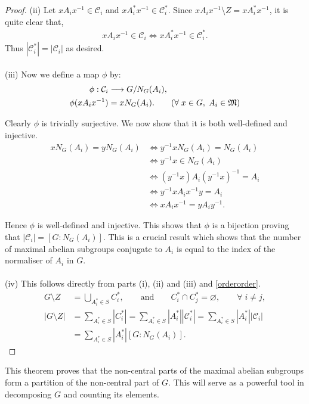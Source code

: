\documentclass[a4paper , 11pt]{book}
\theoremstyle{definition}
\theoremstyle{remark}
\begin{document}
\begin{proof}
(ii) Let $x A_i x^{-1} \in \mathcal{C}_i$ and $x A_i^* x^{-1} \in \mathcal{C}_i^*$. Since $x A_i x^{-1} \! \setminus \! Z = x A_i^* x^{-1}$, it is quite clear that,
\begin{align*} x A_i x^{-1} \in \mathcal{C}_i \iff x A_i^* x^{-1} \in \mathcal{C}_i^*.
\end{align*}
Thus $|\mathcal{C}_i^*| = |\mathcal{C}_i|$ as desired. \\
\\
(iii) Now we define a map $\phi$ by:
\begin{align*} \phi: \mathcal{C}_i &\longrightarrow G / N_G(A_i),
\\ \phi(xA_ix^{-1}) &= xN_G(A_i). \tag{$\forall \; x \in G, \; A_i \in \mathfrak{M}$}
\end{align*}

Clearly $\phi$ is trivially surjective. We now show that it is both well-defined and injective.
\begin{align*} xN_G(A_i) = yN_G(A_i) &\iff y^{-1}xN_G(A_i) = N_G(A_i) \\
&\iff y^{-1}x \in N_G(A_i) \\
&\iff (y^{-1}x)A_i(y^{-1}x)^{-1} = A_i \\
&\iff y^{-1}xA_ix^{-1}y = A_i \\
&\iff xA_ix^{-1} = yA_iy^{-1}.
\end{align*}

Hence $\phi$ is well-defined and injective. This shows that $\phi$ is a bijection proving that $|\mathcal{C}_i| = [G:N_G(A_i)]$. This is a crucial result which shows that the number of maximal abelian subgroups conjugate to $A_i$ is equal to the index of the normaliser of $A_i$ in $G$. \\
\\
(iv) This follows directly from parts (i), (ii) and (iii) and \eqref{orderorder}.
\begin{align*} G \! \setminus \! Z &= \bigcup\limits_{A_i^* \in S} C_i^*,  \qquad \text{and}  \qquad C_i^* \cap C_j^* = \varnothing, \qquad \forall \;  i \neq j, \\
 |G \! \setminus \! Z| &=  \sum_{A_i^* \in S} |C_i^*| = \sum_{A_i^* \in S} |A_i^*||\mathcal{C}_i^*| = \sum_{A_i^* \in S} |A_i^*||\mathcal{C}_i|
\\ &= \sum_{A_i^* \in S} |A_i^*| [G:N_G(A_i)].
\end{align*}

\end{proof}

This theorem proves that the non-central parts of the maximal abelian subgroups form a partition of the non-central part of $G$. This will serve as a powerful tool in decomposing $G$ and counting its elements.
\end{document}
